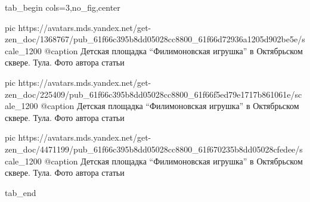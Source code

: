  
 
 
 
 


\ifcmt
  tab_begin cols=3,no_fig,center

     pic https://avatars.mds.yandex.net/get-zen_doc/1368767/pub_61f66c395b8dd05028cc8800_61f66d72936a1205d902be5e/scale_1200
     @caption Детская площадка \enquote{Филимоновская игрушка} в Октябрьском сквере. Тула. Фото автора статьи

     pic https://avatars.mds.yandex.net/get-zen_doc/225409/pub_61f66c395b8dd05028cc8800_61f66f5ed79e1717b861061e/scale_1200
     @caption Детская площадка \enquote{Филимоновская игрушка} в Октябрьском сквере. Тула. Фото автора статьи

     pic https://avatars.mds.yandex.net/get-zen_doc/4471199/pub_61f66c395b8dd05028cc8800_61f670235b8dd05028cfedee/scale_1200
     @caption Детская площадка \enquote{Филимоновская игрушка} в Октябрьском сквере. Тула. Фото автора статьи

  tab_end
\fi
